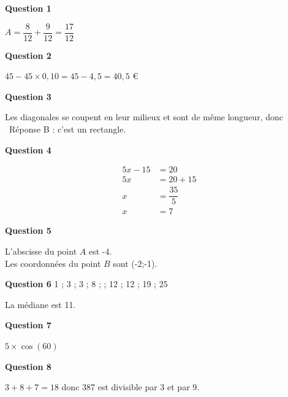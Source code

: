
\medskip

\textbf{Question 1}

$A=\dfrac{8}{12}+\dfrac{9}{12}=\dfrac{17}{12}$
\medskip

\textbf{Question 2}

$45-45\times 0,10=45-4,5=40,5$ \euro{}
\medskip

\textbf{Question 3}

Les diagonales se coupent en leur milieux et sont de même longueur, donc \\
\ Réponse B : c'est un rectangle.

\medskip

\textbf{Question 4}

\begin{align*}
5x-15&=20\\
5x&=20+15\\
x&=\dfrac{35}{5}\\
x&=7
\end{align*}
\medskip

\textbf{Question 5}

L'abscisse du point $A$ est -4.\\
Les coordonnées du point $B$ sont (-2;-1).
\medskip

\textbf{Question 6}
1 ; 3 ; 3 ; 8 ;  ; 12 ; 12 ; 19 ; 25 

La médiane est 11.
\medskip

\textbf{Question 7}

$5\times\cos(60)$

\textbf{Question 8}

$3+8+7=18$ donc 387 est divisible par 3 et par 9. 
\medskip
